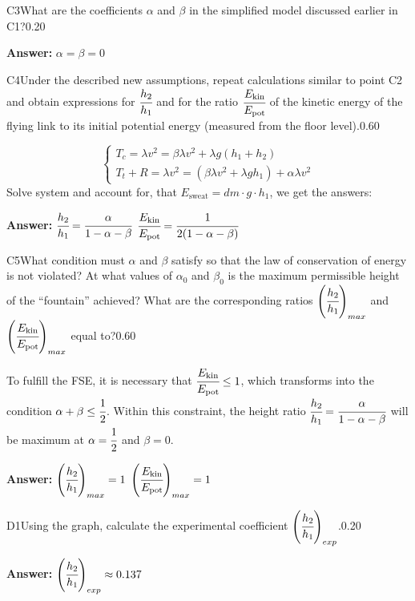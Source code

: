 \documentclass[11pt,a4paper]{article}
\begin{document}
\begin{solcard}{C3}{What are the coefficients $\alpha$ and $\beta$ in the simplified model discussed earlier in C1?}{0.20}
\par\smallskip\noindent\textbf{Answer:} $\alpha = \beta = 0$
\end{solcard}

\begin{solcard}{C4}{Under the described new assumptions, repeat calculations similar to point C2 and obtain expressions for $\cfrac{h_2}{h_1}$ and for the ratio $\cfrac{E_\text{kin}}{E_\text{pot}}$ of the kinetic energy of the flying link to its initial potential energy (measured from the floor level).}{0.60}

$$ \begin{cases} T_c = \lambda v^2 = \beta \lambda v^2 + \lambda g (h_1 + h_2) \\ T_t + R = \lambda v^2 = \left( \beta \lambda v^2 + \lambda g h_1 \right) + \alpha \lambda v^2 \end{cases} $$ Solve system and account for, that $E_\text{sweat} = dm \cdot g \cdot h_1$, we get the answers:

\par\smallskip\noindent\textbf{Answer:} $\cfrac{h_2}{h_1} = \cfrac{\alpha}{1-\alpha-\beta}$ $\cfrac{E_\text{kin}}{E_\text{pot}} = \cfrac{1}{2(1-\alpha-\beta)}$
\end{solcard}

\begin{solcard}{C5}{What condition must $\alpha$ and $\beta$ satisfy so that the law of conservation of energy is not violated? At what values of $\alpha_0$ and $\beta_0$ is the maximum permissible height of the “fountain” achieved? What are the corresponding ratios $\left( \cfrac{h_2}{h_1} \right)_{max}$ and $\left( \cfrac{E_\text{kin}}{E_\text{pot}} \right) _{max}$ equal to?}{0.60}

To fulfill the FSE, it is necessary that $\cfrac{E_\text{kin}}{E_\text{pot}} \leq 1$, which transforms into the condition $\alpha + \beta \leq \cfrac{1}{2}$. Within this constraint, the height ratio $\cfrac{h_2}{h_1} = \cfrac{\alpha}{1-\alpha-\beta}$ will be maximum at $\alpha = \cfrac{1}{2}$ and $\beta=0$.

\par\smallskip\noindent\textbf{Answer:} $\left( \cfrac{h_2}{h_1} \right)_{max} = 1$ $\left( \cfrac{E_\text{kin}}{E_\text{pot}} \right) _{max} = 1$
\end{solcard}

\begin{solcard}{D1}{Using the graph, calculate the experimental coefficient $\left( \cfrac{h_2}{h_1} \right)_{exp}$.}{0.20}
\par\smallskip\noindent\textbf{Answer:} $\left( \cfrac{h_2}{h_1} \right)_{exp} \approx 0.137$
\end{solcard}
\end{document}

